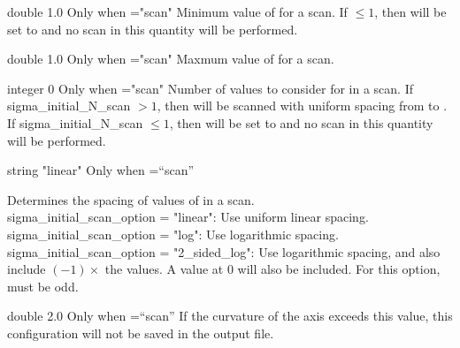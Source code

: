 \myhrule

{double}
{1.0}
{Only when ={\ttfamily "scan"}}
{Minimum value of  for a scan. If $\le 1$, then  will be set to  and no scan in this quantity will be performed.
}

\myhrule

{double}
{1.0}
{Only when ={\ttfamily "scan"}}
{Maxmum value of  for a scan.
}

\myhrule

{integer}
{0}
{Only when ={\ttfamily "scan"}}
{Number of values to consider for  in a scan. If {\ttfamily sigma\_initial\_N\_scan} $>1$, then  will be scanned with uniform spacing from  to .
If {\ttfamily sigma\_initial\_N\_scan} $\le 1$, then  will be set to  and no scan in
this quantity will be performed.
}

\myhrule

{string}
{{\ttfamily "linear"}}
{Only when ={\ttfamily ``scan''}}
{Determines the spacing of values of  in a scan.\\

{\ttfamily sigma\_initial\_scan\_option} = {\ttfamily "linear"}: Use uniform linear spacing.\\

{\ttfamily sigma\_initial\_scan\_option} = {\ttfamily "log"}: Use logarithmic spacing.\\

{\ttfamily sigma\_initial\_scan\_option} = {\ttfamily "2\_sided\_log"}: Use logarithmic spacing, and also include $(-1)\times$ the values. A value at 0 will also be included. For this option,  must be odd.

}

\myhrule

{double}
{2.0}
{Only when ={\ttfamily ``scan''}}
{If the curvature of the axis exceeds this value, this configuration will not be saved in the output file.
}

\myhrule


